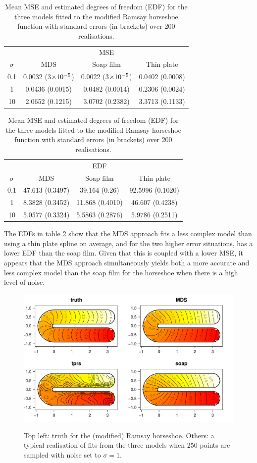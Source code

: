 \begin{table}[ht]
\centering
\begin{tabular}{c c c c}
 & & MSE & \\ 
$\sigma$ & MDS & Soap film & Thin plate\\ 
\hline
0.1  & 0.0032 (3$\times10^{-5}$) & 0.0022 (3$\times10^{-5}$) & 0.0402 (0.0008) \\ 
1  & 0.0436 (0.0015) & 0.0482 (0.0014) & 0.2306 (0.0024) \\ 
10  & 2.0652 (0.1215) & 3.0702 (0.2382) & 3.3713 (0.1133) \\ 
\end{tabular}
\begin{tabular}{c  c c c }
&  & EDF & \\ 
$\sigma$ & MDS & Soap film & Thin plate\\ 
\hline
0.1 & 47.613 (0.3497) & 39.164 (0.26) & 92.5996 (0.1020)\\ 
1  & 8.3828 (0.3452) & 11.868 (0.4010) & 46.607 (0.4238)\\ 
10 & 5.0577 (0.3324) & 5.5863 (0.2876) & 5.9786 (0.2511)\\ 
\end{tabular}
\caption{Mean MSE and estimated degrees of freedom (EDF) for the three models fitted to the modified Ramsay horseshoe function with standard errors (in brackets) over 200 realisations.}
\label{ramsayresultstable}
\end{table}

The EDFs in table \ref{ramsayresultstable} show that the MDS approach fits a less complex model than using a thin plate spline on average, and for the two higher error situations, has a lower EDF than the soap film. Given that this is coupled with a lower MSE, it appears that the MDS approach simultaneously yields both a more accurate and less complex model than the soap film for the horseshoe when there is a high level of noise.

\begin{figure}
\centering
\includegraphics[width=6in]{mds/figs/ramsay-fit-1.pdf} \\
\caption{Top left: truth for the (modified) Ramsay horseshoe. Others: a typical realisation of fits from the three models when 250 points are sampled with noise set to $\sigma=1$.}
\label{mds-ramsay-fit-1}
\end{figure}

